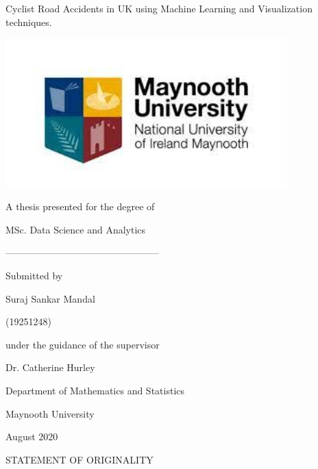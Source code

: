 \documentclass[
  a4paper,
]{article}
\author{}
\date{\vspace{-2.5em}}
\begin{document}

\newpage

\begin{center}          %

\LARGE{Cyclist Road Accidents in UK using Machine Learning and Visualization techniques.} %

\bigskip                %
\bigskip


\begin{center}\includegraphics[width=4.28in]{university logo} \end{center}

\large{A thesis presented for the degree of }

\large{MSc. Data Science and Analytics} 

------------------------------------------------

\large{Submitted by}



\LARGE{Suraj Sankar Mandal}

\LARGE(19251248)

\bigskip
\bigskip

\large{under the guidance of the supervisor}


\LARGE{Dr. Catherine Hurley}

\bigskip
\bigskip
\bigskip
\bigskip

\large{Department of Mathematics and Statistics}

\large{Maynooth University}

\large{August 2020}



\end{center}

\newpage

\begin{center}

\LARGE{STATEMENT OF ORIGINALITY}
 

\end{center}
\end{document}
